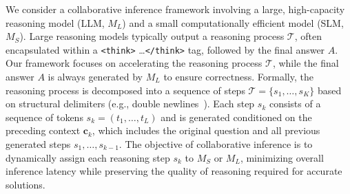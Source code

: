 \documentclass[11pt]{article}
\begin{document}
We consider a collaborative inference framework involving a large, high-capacity reasoning model (LLM, $M_L$) and a small computationally efficient model (SLM, $M_S$). 
Large reasoning models typically output a reasoning process $\mathcal{T}$, often encapsulated within a \texttt{<think>} \dots \texttt{</think>} tag, followed by the final answer $A$. 
Our framework focuses on accelerating the reasoning process $\mathcal{T}$, while the final answer $A$ is always generated by $M_L$ to ensure correctness.
Formally, the reasoning process is decomposed into a sequence of steps $\mathcal{T} = \{s_1,\dots, s_K\}$ based on structural delimiters (e.g., double newlines~\cite{pan2025specreason, yang2025speculative}). Each step $s_k$ consists of a sequence of tokens $s_k = (t_1, \dots, t_L)$ and is generated conditioned on the preceding context $\mathbf{c}_k$, which includes the original question and all previous generated steps {\(s_1,\ldots,s_{k-1}\)}.
The objective of collaborative inference is to dynamically assign each reasoning step $s_k$ to $M_S$ or $M_L$, minimizing overall inference latency while preserving the quality of reasoning required for accurate solutions.


\end{document}
